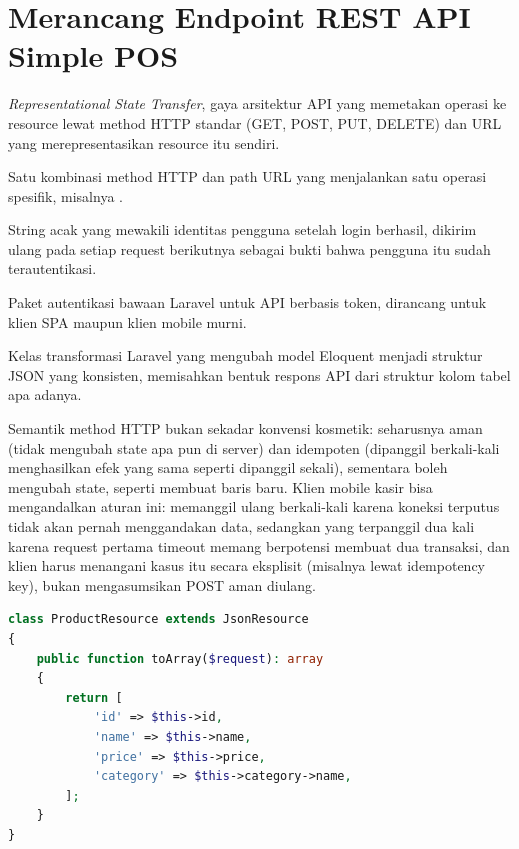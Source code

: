 \section{Merancang Endpoint REST API Simple POS}
\label{sec:membangun-rest-api-1}

\begin{istilahpenting}
\begin{description}[leftmargin=0pt,style=nextline]
  \item[REST] \textit{Representational State Transfer}, gaya arsitektur API yang memetakan operasi ke resource lewat method HTTP standar (GET, POST, PUT, DELETE) dan URL yang merepresentasikan resource itu sendiri.
  \item[Endpoint] Satu kombinasi method HTTP dan path URL yang menjalankan satu operasi spesifik, misalnya .
  \item[Token] String acak yang mewakili identitas pengguna setelah login berhasil, dikirim ulang pada setiap request berikutnya sebagai bukti bahwa pengguna itu sudah terautentikasi.
  \item[Sanctum] Paket autentikasi bawaan Laravel untuk API berbasis token, dirancang untuk klien SPA maupun klien mobile murni.
  \item[API Resource] Kelas transformasi Laravel yang mengubah model Eloquent menjadi struktur JSON yang konsisten, memisahkan bentuk respons API dari struktur kolom tabel apa adanya.
\end{description}
\end{istilahpenting}

Semantik method HTTP bukan sekadar konvensi kosmetik: 
seharusnya aman (tidak mengubah state apa pun di server) dan idempoten
(dipanggil berkali-kali menghasilkan efek yang sama seperti dipanggil
sekali), sementara  boleh mengubah state, seperti membuat
baris baru. Klien mobile kasir bisa mengandalkan aturan ini: memanggil
ulang  berkali-kali karena koneksi terputus
tidak akan pernah menggandakan data, sedangkan  yang terpanggil dua kali karena request pertama
timeout memang berpotensi membuat dua transaksi, dan klien harus
menangani kasus itu secara eksplisit (misalnya lewat idempotency key),
bukan mengasumsikan POST aman diulang.

\begin{lstlisting}[language=php, title=\lstfile{app/Http/Resources/ProductResource.php}]
class ProductResource extends JsonResource
{
    public function toArray($request): array
    {
        return [
            'id' => $this->id,
            'name' => $this->name,
            'price' => $this->price,
            'category' => $this->category->name,
        ];
    }
}
\end{lstlisting}

